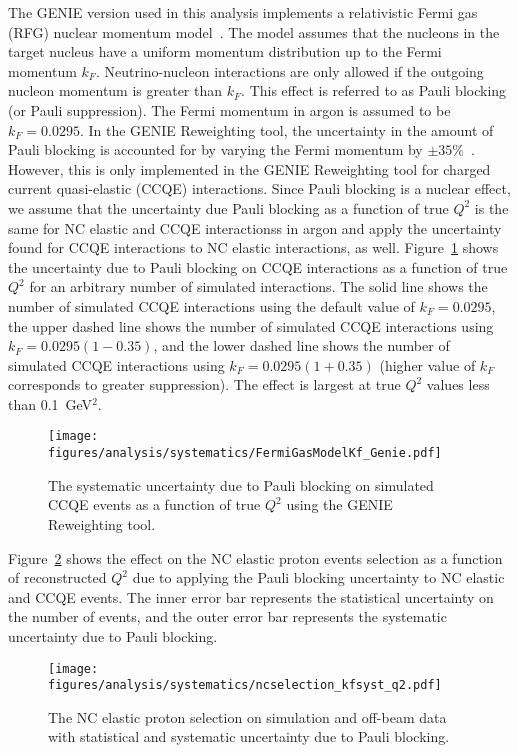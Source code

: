     The GENIE version used in this analysis implements a relativistic Fermi gas
    (RFG) nuclear momentum model~\cite{Bodek:1981wr}. The model assumes that the
    nucleons in the target nucleus have a uniform momentum distribution up to
    the Fermi momentum $k_F$. Neutrino-nucleon interactions are only allowed if
    the outgoing nucleon momentum is greater than $k_F$. This effect is
    referred to as Pauli blocking (or Pauli suppression). The Fermi momentum in
    argon is assumed to be $k_F = 0.0295$. In the GENIE Reweighting tool, the
    uncertainty in the amount of Pauli blocking is accounted for by varying the
    Fermi momentum by $\pm 35\%$~\cite{Andreopoulos:2015wxa}. However, this is
    only implemented in the GENIE Reweighting tool for charged current
    quasi-elastic (CCQE) interactions. Since Pauli blocking is a nuclear
    effect, we assume that the uncertainty due Pauli blocking as a function of
    true $Q^2$ is the same for NC elastic and CCQE interactionss in argon and
    apply the uncertainty found for CCQE interactions to NC elastic
    interactions, as well.  Figure~\ref{fig:pauliblock} shows the uncertainty
    due to Pauli blocking on CCQE interactions as a function of true $Q^2$ for
    an arbitrary number of simulated interactions. The solid line shows the
    number of simulated CCQE interactions using the default value of $k_F =
    0.0295$, the upper dashed line shows the number of simulated CCQE
    interactions using $k_F = 0.0295(1 - 0.35)$, and the lower dashed line
    shows the number of simulated CCQE interactions using $k_F = 0.0295(1 +
    0.35)$ (higher value of $k_F$ corresponds to greater suppression). The
    effect is largest at true $Q^2$ values less than 0.1~GeV$^2$.
    \begin{figure}[ht]
      \centering
      \texttt{[image: figures/analysis/systematics/FermiGasModelKf\_Genie.pdf]}
      \caption{The systematic uncertainty due to Pauli blocking on simulated
      CCQE events as a function of true $Q^2$ using the GENIE Reweighting
      tool.}
      \label{fig:pauliblock}
    \end{figure}

    Figure~\ref{fig:systpauli} shows the effect on the NC elastic proton events
    selection as a function of reconstructed $Q^2$ due to applying the Pauli
    blocking uncertainty to NC elastic and CCQE events. The inner error bar
    represents the statistical uncertainty on the number of events, and the
    outer error bar represents the systematic uncertainty due to Pauli
    blocking.
    \begin{figure}[ht]
      \centering
      \texttt{[image: figures/analysis/systematics/ncselection\_kfsyst\_q2.pdf]}
      \caption{The NC elastic proton selection on simulation and off-beam data
      with statistical and systematic uncertainty due to Pauli blocking.}
      \label{fig:systpauli}
    \end{figure}

